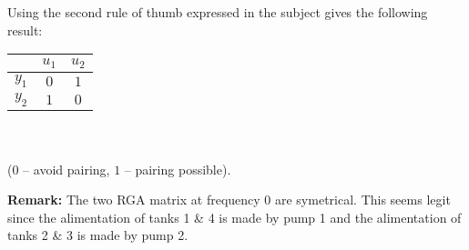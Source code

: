 Using the second rule of thumb expressed in the subject gives the following result:

\begin{center}
\begin{tabular}{|c|cc|}
    \hline
    & $u_1$ & $u_2$ \\ 
    \hline
    $y_1$ & $0$ & $1$ \\
    $y_2$ & $1$ & $0$ \\
    \hline
\end{tabular} \ \\ \ \\
($0$ -- avoid pairing, $1$ -- pairing possible).
\end{center}


\textbf{Remark:} The two RGA matrix at frequency $0$ are symetrical. This seems legit since the alimentation of tanks 1 \& 4 is made by pump 1 and the alimentation of tanks 2 \& 3 is made by pump 2.
